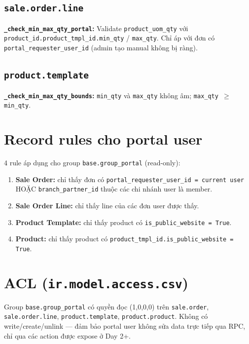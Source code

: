 \subsection{\texttt{sale.order.line}}

\textbf{\texttt{\_check\_min\_max\_qty\_portal}:} Validate \texttt{product\_uom\_qty} với \texttt{product\_id.product\_tmpl\_id.min\_qty} / \texttt{max\_qty}. Chỉ áp với đơn có \texttt{portal\_requester\_user\_id} (admin tạo manual không bị ràng).

\subsection{\texttt{product.template}}

\textbf{\texttt{\_check\_min\_max\_qty\_bounds}:} \texttt{min\_qty} và \texttt{max\_qty} không âm; \texttt{max\_qty $\geq$ min\_qty}.

\section{Record rules cho portal user}

4 rule áp dụng cho group \texttt{base.group\_portal} (read-only):

\begin{enumerate}
    \item \textbf{Sale Order:} chỉ thấy đơn có \texttt{portal\_requester\_user\_id = current user} HOẶC \texttt{branch\_partner\_id} thuộc các chi nhánh user là member.
    \item \textbf{Sale Order Line:} chỉ thấy line của các đơn user được thấy.
    \item \textbf{Product Template:} chỉ thấy product có \texttt{is\_public\_website = True}.
    \item \textbf{Product:} chỉ thấy product có \texttt{product\_tmpl\_id.is\_public\_website = True}.
\end{enumerate}

\section{ACL (\texttt{ir.model.access.csv})}

Group \texttt{base.group\_portal} có quyền đọc (1,0,0,0) trên \texttt{sale.order}, \texttt{sale.order.line}, \texttt{product.template}, \texttt{product.product}. Không có write/create/unlink — đảm bảo portal user không sửa data trực tiếp qua RPC, chỉ qua các action được expose ở Day 2+.


